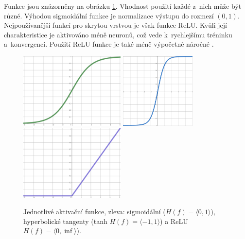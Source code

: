 Funkce jsou znázorněny na obrázku \ref{aktivacni_funkce}. Vhodnost použití každé z~nich může být různé. Výhodou sigmoidální funkce je normalizace výstupu do rozmezí $(0,1)$. Nejpoužívanější funkcí pro skrytou vrstvou je však funkce ReLU. Kvůli její charakteristice je aktivováno méně neuronů, což vede k~rychlejšímu tréninku a~konvergenci. Použití ReLU funkce je také méně výpočetně náročné \cite{medium:activation_function}.

\begin{figure}[hbt]
    \centering
	    \includegraphics[width=0.33\linewidth, height=1.5in]{obrazky/sigmoid.pdf}\hfill
    	\includegraphics[width=0.33\linewidth, height=1.5in]{obrazky/tanh.pdf}\hfill
    	\includegraphics[width=0.33\linewidth, height=1.5in]{obrazky/relu.pdf}\hfill
	\caption{Jednotlivé aktivační funkce, zleva: sigmoidální ($H(f)=\langle 0,1 \rangle$), hyperbolické tangenty (tanh $H(f)=\langle -1,1 \rangle$) a ReLU $H(f)=\langle 0,\inf \rangle$).}
	\label{aktivacni_funkce}
\end{figure}



